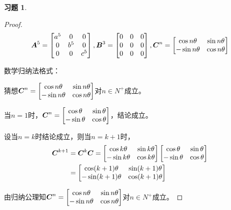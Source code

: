 \documentclass{ctexart}
\newtheorem{problem}{习题}[section]
\begin{document}
\begin{problem}
\end{problem}
\begin{proof}
    \begin{equation*}
\boldsymbol{A}^5=\begin{bmatrix}a^5&0&0\\0&b^5&0\\0&0&c^5\end{bmatrix},\boldsymbol{B}^3=\begin{bmatrix}0&0&0\\0&0&0\\0&0&0\end{bmatrix},\boldsymbol{C}^n=\begin{bmatrix}\cos n\theta&\sin n\theta\\-\sin n\theta&\cos n\theta\end{bmatrix}
    \end{equation*}

    数学归纳法格式：

    猜想\(\boldsymbol{C}^n=\begin{bmatrix}\cos n\theta&\sin n\theta\\-\sin n\theta&\cos n\theta\end{bmatrix}\)对\(n\in N^+\)成立。

    当\(n=1\)时，\(\boldsymbol{C}^n=\begin{bmatrix}\cos \theta&\sin \theta\\-\sin \theta&\cos \theta\end{bmatrix}\)，结论成立。

    设当\(n=k\)时结论成立，则当\(n=k+1\)时，
    \begin{align*}
        \boldsymbol{C}^{k+1} & =\boldsymbol{C}^k\boldsymbol{C}=\begin{bmatrix}\cos k\theta&\sin k\theta\\-\sin k\theta&\cos k\theta\end{bmatrix}\begin{bmatrix}\cos \theta&\sin \theta\\-\sin \theta&\cos \theta\end{bmatrix} \\
                    & =\begin{bmatrix}\cos (k+1)\theta&\sin (k+1)\theta\\-\sin (k+1)\theta&\cos (k+1)\theta\end{bmatrix}
    \end{align*}

    由归纳公理知\(\boldsymbol{C}^n=\begin{bmatrix}\cos n\theta&\sin n\theta\\-\sin n\theta&\cos n\theta\end{bmatrix}\)对\(n\in N^+\)成立。
\end{proof}
\end{document}
